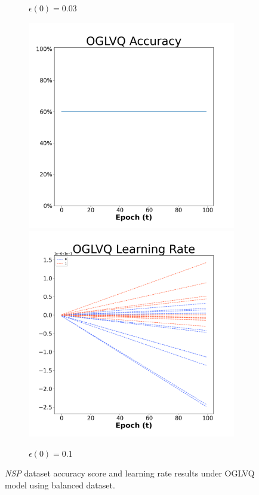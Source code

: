 \begin{figure}[H]
\begin{subfigure}{0.3\textwidth}
  \caption{$\epsilon(0)=0.03$}
\end{subfigure}\hfil %
\begin{subfigure}{0.3\textwidth}
  \includegraphics[width=\linewidth]{images/exper1/NSP/OGLVQ_0.1_acc.png}
  \includegraphics[width=\linewidth]{images/exper1/NSP/OGLVQ_0.1_lr.png}
  \caption{$\epsilon(0)=0.1$}
\end{subfigure}

\caption{\textit{NSP} dataset accuracy score and learning rate results under OGLVQ model using balanced dataset.}
\end{figure}



